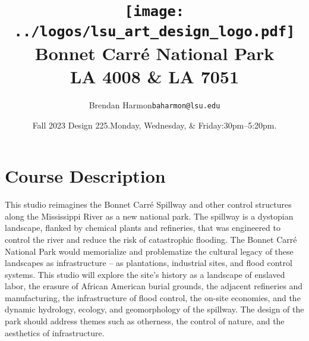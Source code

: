 \documentclass[11pt,article,oneside]{memoir}
\makeatletter
\def\myauthor{Author}
\def\mytitle{Title}
\def\myemail{baharmon@lsu.edu}
\def\myauthor{Brendan Harmon}
\def\mytitle{\texttt{[image: ../logos/lsu\_art\_design\_logo.pdf]}\\
[0.1cm]{\Large Bonnet Carré National Park} \\ 
[-0.2cm]{\normalfont \normalsize LA 4008 \& LA 7051}}
\newcommand{\globalcolor}[1]{%
  \color{#1}\global\let\default@color\current@color
}
\makeatother
\begin{document}
\setlength\bibitemsep{0.5em}

\setmainfont{IBM Plex Sans}
\setmonofont[Scale=0.8]{IBM Plex Mono}

\def\ind{\hangindent=1 true cm\hangafter=1 \noindent}
\def\labelitemi{$\cdot$}

\title{\LARGE \mytitle}
\author{\Large\myauthor \newline \footnotesize\texttt{\noindent\myemail}}
\date{Fall 2023 Design 225.\newline Monday, Wednesday, \& Friday:30pm--5:20pm.}
\published{\,}


\globalcolor{black}
\vspace*{-10em}
\maketitle
{}
\clearpage



\globalcolor{black}

\vspace*{-10em}
\maketitle

\section{Course Description}

This studio reimagines the Bonnet Carré Spillway
and other control structures along the Mississippi River
as a new national park.
%
The spillway is a dystopian landscape,
flanked by chemical plants and refineries, 
that was engineered to control the river
and reduce the risk of catastrophic flooding.
%
The Bonnet Carré National Park
would memorialize and problematize the cultural legacy
of these landscapes as infrastructure
-- as plantations, industrial sites, and flood control systems.
%
This studio will explore
the site's history as a landscape of enslaved labor, 
the erasure of African American burial grounds,
the adjacent refineries and manufacturing,
the infrastructure of flood control,
the on-site economies, 
and the dynamic hydrology, ecology, and geomorphology
of the spillway. 
%
The design of the park should address themes such as
otherness,
the control of nature, 
and the aesthetics of infrastructure.
\end{document}

